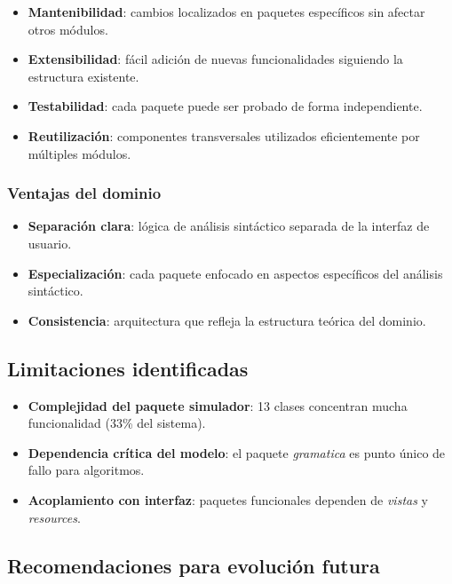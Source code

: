 \begin{itemize}
    \item \textbf{Mantenibilidad}: cambios localizados en paquetes específicos sin afectar otros módulos.
    \item \textbf{Extensibilidad}: fácil adición de nuevas funcionalidades siguiendo la estructura existente.
    \item \textbf{Testabilidad}: cada paquete puede ser probado de forma independiente.
    \item \textbf{Reutilización}: componentes transversales utilizados eficientemente por múltiples módulos.
\end{itemize}

\subsubsection{Ventajas del dominio}

\begin{itemize}
    \item \textbf{Separación clara}: lógica de análisis sintáctico separada de la interfaz de usuario.
    \item \textbf{Especialización}: cada paquete enfocado en aspectos específicos del análisis sintáctico.
    \item \textbf{Consistencia}: arquitectura que refleja la estructura teórica del dominio.
\end{itemize}

\subsection{Limitaciones identificadas}

\begin{itemize}
    \item \textbf{Complejidad del paquete simulador}: 13 clases concentran mucha funcionalidad (33\% del sistema).
    \item \textbf{Dependencia crítica del modelo}: el paquete \textit{gramatica} es punto único de fallo para algoritmos.
    \item \textbf{Acoplamiento con interfaz}: paquetes funcionales dependen de \textit{vistas} y \textit{resources}.
\end{itemize}

\subsection{Recomendaciones para evolución futura}

